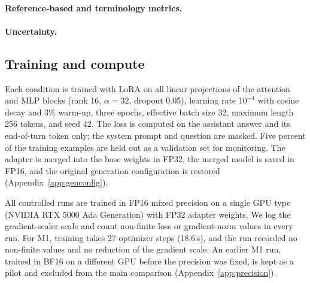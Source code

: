 \paragraph{Reference-based and terminology metrics.}

\paragraph{Uncertainty.}

\subsection{Training and compute}
\label{sec:setup-compute}

Each condition is trained with LoRA on all linear projections of the attention and MLP blocks (rank 16, $\alpha=32$, dropout 0.05), learning rate $10^{-4}$ with cosine decay and 3\% warm-up, three epochs, effective batch size 32, maximum length 256 tokens, and seed 42.
The loss is computed on the assistant answer and its end-of-turn token only; the system prompt and question are masked.
Five percent of the training examples are held out as a validation set for monitoring.
The adapter is merged into the base weights in FP32, the merged model is saved in FP16, and the original generation configuration is restored (Appendix~\ref{app:genconfig}).

All controlled runs are trained in FP16 mixed precision on a single GPU type (NVIDIA RTX 5000 Ada Generation) with FP32 adapter weights.
We log the gradient-scaler scale and count non-finite loss or gradient-norm values in every run.
For M1, training takes 27 optimizer steps (18.6\,s), and the run recorded no non-finite values and no reduction of the gradient scale.
An earlier M1 run, trained in BF16 on a different GPU before the precision was fixed, is kept as a pilot and excluded from the main comparison (Appendix~\ref{app:precision}).
